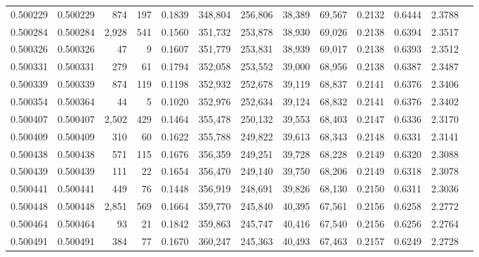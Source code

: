 \begin{tabular}{rrrrrrrrrrrrr}
0.500229 & 0.500229 &   874 &   197 &                                     0.1839 & 348,804 & 256,806 &  38,389 &  69,567 & 0.2132 & 0.6444 & 2.3788 \\
0.500284 & 0.500284 & 2,928 &   541 &                                     0.1560 & 351,732 & 253,878 &  38,930 &  69,026 & 0.2138 & 0.6394 & 2.3517 \\
0.500326 & 0.500326 &    47 &     9 &                                     0.1607 & 351,779 & 253,831 &  38,939 &  69,017 & 0.2138 & 0.6393 & 2.3512 \\
0.500331 & 0.500331 &   279 &    61 &                                     0.1794 & 352,058 & 253,552 &  39,000 &  68,956 & 0.2138 & 0.6387 & 2.3487 \\
0.500339 & 0.500339 &   874 &   119 &                                     0.1198 & 352,932 & 252,678 &  39,119 &  68,837 & 0.2141 & 0.6376 & 2.3406 \\
0.500354 & 0.500364 &    44 &     5 &                                     0.1020 & 352,976 & 252,634 &  39,124 &  68,832 & 0.2141 & 0.6376 & 2.3402 \\
0.500407 & 0.500407 & 2,502 &   429 &                                     0.1464 & 355,478 & 250,132 &  39,553 &  68,403 & 0.2147 & 0.6336 & 2.3170 \\
0.500409 & 0.500409 &   310 &    60 &                                     0.1622 & 355,788 & 249,822 &  39,613 &  68,343 & 0.2148 & 0.6331 & 2.3141 \\
0.500438 & 0.500438 &   571 &   115 &                                     0.1676 & 356,359 & 249,251 &  39,728 &  68,228 & 0.2149 & 0.6320 & 2.3088 \\
0.500439 & 0.500439 &   111 &    22 &                                     0.1654 & 356,470 & 249,140 &  39,750 &  68,206 & 0.2149 & 0.6318 & 2.3078 \\
0.500441 & 0.500441 &   449 &    76 &                                     0.1448 & 356,919 & 248,691 &  39,826 &  68,130 & 0.2150 & 0.6311 & 2.3036 \\
0.500448 & 0.500448 & 2,851 &   569 &                                     0.1664 & 359,770 & 245,840 &  40,395 &  67,561 & 0.2156 & 0.6258 & 2.2772 \\
0.500464 & 0.500464 &    93 &    21 &                                     0.1842 & 359,863 & 245,747 &  40,416 &  67,540 & 0.2156 & 0.6256 & 2.2764 \\
0.500491 & 0.500491 &   384 &    77 &                                     0.1670 & 360,247 & 245,363 &  40,493 &  67,463 & 0.2157 & 0.6249 & 2.2728 \\

\end{tabular}
